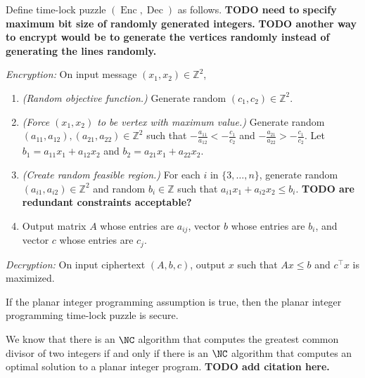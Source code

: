 \documentclass{article}
\newcommand{\todo}[1]{\textbf{TODO #1}}
\newcommand{\Enc}{\operatorname{Enc}}
\newcommand{\Dec}{\operatorname{Dec}}
\begin{document}
\begin{protocol}
  Define time-lock puzzle $(\Enc, \Dec)$ as follows.
  \todo{need to specify maximum bit size of randomly generated integers.}
  \todo{another way to encrypt would be to generate the vertices randomly instead of generating the lines randomly.}

  \emph{Encryption:} On input message $(x_1, x_2) \in \mathbb{Z}^2$,
  \begin{enumerate}
  \item \emph{(Random objective function.)}
    Generate random $(c_1, c_2) \in \mathbb{Z}^2$.
  \item \emph{(Force $(x_1, x_2)$ to be vertex with maximum value.)}
    Generate random $(a_{11}, a_{12}), (a_{21}, a_{22}) \in \mathbb{Z}^2$ such that $-\frac{a_{11}}{a_{12}} < -\frac{c_1}{c_2}$ and $-\frac{a_{21}}{a_{22}} > -\frac{c_1}{c_2}$.
    Let $b_1 = a_{11} x_1 + a_{12} x_2$ and $b_2 = a_{21} x_1 + a_{22} x_2$.
  \item \emph{(Create random feasible region.)}
    For each $i$ in $\{3, \dotsc, n\}$, generate random $(a_{i1}, a_{i2}) \in \mathbb{Z}^2$ and random $b_i \in \mathbb{Z}$ such that $a_{i1} x_1 + a_{i2} x_2 \leq b_i$.
    \todo{are redundant constraints acceptable?}
  \item Output matrix $A$ whose entries are $a_{ij}$, vector $b$ whose entries are $b_i$, and vector $c$ whose entries are $c_j$.
  \end{enumerate}

  \emph{Decryption:} On input ciphertext $(A, b, c)$, output $x$ such that $Ax \leq b$ and $c^\intercal x$ is maximized.
\end{protocol}

\begin{conjecture}
  If the planar integer programming assumption is true, then the planar integer programming time-lock puzzle is secure.
\end{conjecture}

We know that there is an $\NC$ algorithm that computes the greatest common divisor of two integers if and only if there is an $\NC$ algorithm that computes an optimal solution to a planar integer program.
\todo{add citation here.}
\end{document}
